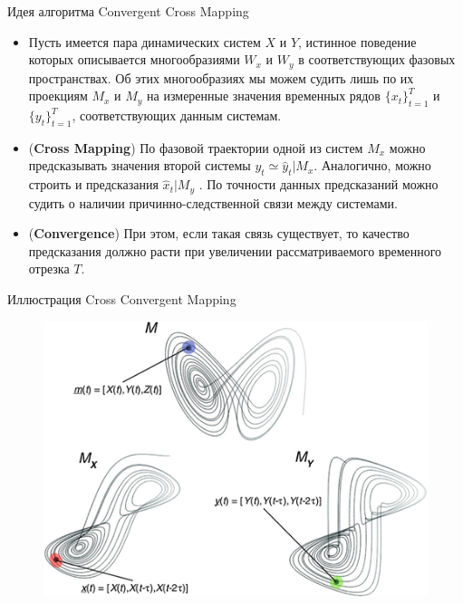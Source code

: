\begin{frame}{Идея алгоритма Convergent Cross Mapping}

\begin{itemize}
    \item Пусть имеется пара динамических систем $X$ и $Y$, истинное поведение которых описывается многообразиями $W_x$ и $W_y$ в соответствующих фазовых пространствах.
Об этих многообразиях мы можем судить лишь по их проекциям $M_x$ и $M_y$ на измеренные значения временных рядов $\{x_t\}_{t=1}^T$ и $\{y_t\}_{t=1}^T$, соответствующих данным системам.
    \item (\textbf{Cross Mapping}) По фазовой траектории одной из систем $M_x$ можно предсказывать значения второй системы $y_t \simeq \hat{y}_t|M_x$. Аналогично, можно строить и предсказания $\hat{x}_t|M_y$ . По точности данных предсказаний можно судить о наличии причинно-следственной связи между системами.
    \item (\textbf{Convergence}) При этом, если такая связь существует, то качество предсказания должно расти при увеличении рассматриваемого временного отрезка $T$.
    
\end{itemize}

\end{frame}
\begin{frame}{Иллюстрация Cross Convergent Mapping}
\begin{figure}
    \centering
    \includegraphics[width=\textwidth]{lecture_5/figs/CCM.png}
\end{figure}
\end{frame}

